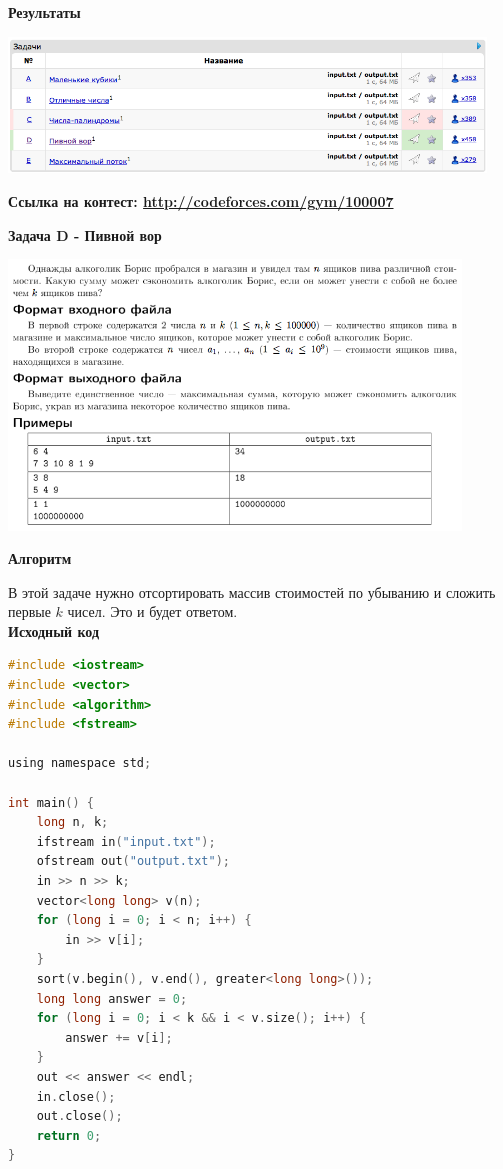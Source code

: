 \documentclass[a4paper,12pt]{article}
\begin{document}
\textbf{{\large Результаты}} \\
\begin{center}
\includegraphics[width=0.95\textwidth]{CT_SAMARA/CT_SAMARA_result.png}\\ [1cm]
\end{center}

\textbf{{\large Ссылка на контест: \url{http://codeforces.com/gym/100007}}}

\newpage
\textbf{{\large Задача D - Пивной вор}}

\begin{center}
\includegraphics[width=0.9\textwidth]{CT_SAMARA/CT_SAMARA_D.png}\\ [1cm]
\end{center}

\textbf{{\large Алгоритм}}

В этой задаче нужно отсортировать массив стоимостей по убыванию и сложить первые $k$ чисел. Это и будет ответом. \\

\textbf{{\large Исходный код}} \\
\begin{lstlisting}[language=C]
#include <iostream>
#include <vector>
#include <algorithm>
#include <fstream>

using namespace std;

int main() {
	long n, k;
	ifstream in("input.txt");
	ofstream out("output.txt");
	in >> n >> k;
	vector<long long> v(n);
	for (long i = 0; i < n; i++) {
		in >> v[i];
	}
	sort(v.begin(), v.end(), greater<long long>());
	long long answer = 0;
	for (long i = 0; i < k && i < v.size(); i++) {
		answer += v[i];
	}
	out << answer << endl;
	in.close();
	out.close();
	return 0;
}
\end{lstlisting}
\end{document}
